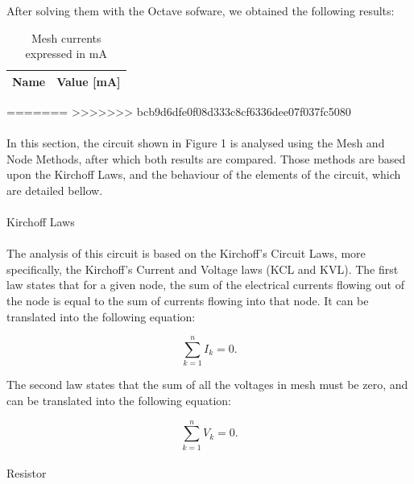 After solving them with the Octave sofware, we obtained the following results:

\begin{table}[hbt!]
  \centering
  \begin{tabular}{|l|r|}
    \hline    
    {\bf Name} & {\bf Value [mA]} \\ \hline
    
  \end{tabular}
  \caption{Mesh currents expressed in mA}
  \label{tab:op}
\end{table}





=======
>>>>>>> bcb9d6dfe0f08d333c8cf6336dee07f037fc5080
\paragraph{} In this section, the circuit shown in Figure 1 is analysed using the Mesh and Node Methods, after which both results are compared.
Those methods are based upon the Kirchoff Laws, and the behaviour of the elements of the circuit, which are detailed bellow.

\paragraph{} Kirchoff Laws

\paragraph{} The analysis of this circuit is based on the Kirchoff's Circuit Laws, more specifically, the Kirchoff's Current and Voltage laws (KCL and KVL). The first law states that for a given node, the sum of the electrical currents flowing out of the node is equal to the sum of currents flowing into that node. 
It can be translated into the following equation:

\begin{equation}
	\sum_{k = 1}^n I_k = 0.
	\label{eq:kcl}
\end{equation}

The second law states that the sum of all the voltages in mesh must be zero, and can be translated into the following equation:

\begin{equation}
	\sum_{k = 1}^n V_k = 0.
	\label{eq:kvl}
\end{equation}

\paragraph{}Resistor

